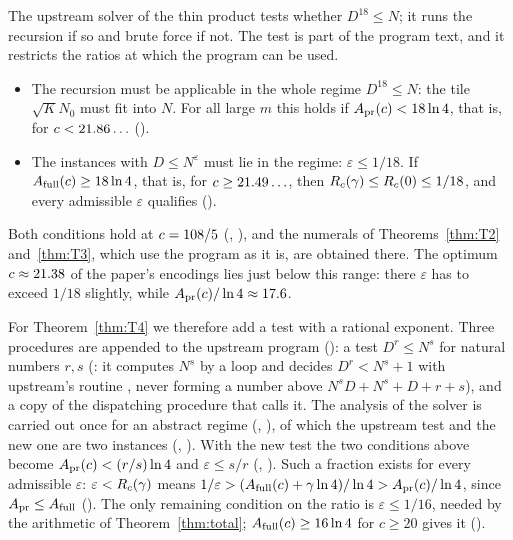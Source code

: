 The upstream solver of the thin product tests whether \(D^{18}\le N\); it runs
the recursion if so and brute force if not.  The test is part of the program
text, and it restricts the ratios at which the program can be used.
\begin{itemize}
\item The recursion must be applicable in the whole regime \(D^{18}\le N\): the
  tile \(\sqrt K N_0\) must fit into \(N\).  For all large \(m\) this holds if
  \(A_{\mathrm{pr}}(c)<18\ln 4\), that is, for \(c<21.86\ldots\)
  ().
\item The instances with \(D\le N^{\varepsilon}\) must lie in the regime:
  \(\varepsilon\le1/18\).  If \(A_{\mathrm{full}}(c)\ge18\ln 4\), that is, for
  \(c\ge21.49\ldots\), then \(R_{c}(\gamma)\le R_{c}(0)\le1/18\), and every
  admissible \(\varepsilon\) qualifies ().
\end{itemize}
Both conditions hold at \(c=108/5\) (,
), and the numerals of Theorems~\ref{thm:T2}
and~\ref{thm:T3}, which use the program as it is, are obtained there.  The
optimum \(c\approx21.38\) of the paper's encodings lies just below this
range: there \(\varepsilon\) has to exceed \(1/18\) slightly, while
\(A_{\mathrm{pr}}(c)/\ln4\approx17.6\).

For Theorem~\ref{thm:T4} we therefore add a test with a rational exponent.
Three procedures are appended to the upstream program (): a
test \(D^{r}\le N^{s}\) for natural numbers \(r,s\) (: it
computes \(N^{s}\) by a loop and decides \(D^{r}<N^{s}+1\) with upstream's
routine , never forming a number above \(N^{s}D+N^{s}+D+r+s\)),
and a copy of the dispatching procedure that calls it.  The analysis of the
solver is carried out once for an abstract regime (,
), of which the upstream test and the new one
are two instances (, ).  With the new test the two
conditions above become \(A_{\mathrm{pr}}(c)<(r/s)\ln4\) and \(\varepsilon\le s/r\)
(, ).  Such a fraction exists for
every admissible \(\varepsilon\): \(\varepsilon<R_{c}(\gamma)\) means
\(1/\varepsilon>(A_{\mathrm{full}}(c)+\gamma\ln4)/\ln4>A_{\mathrm{pr}}(c)/\ln4\), since
\(A_{\mathrm{pr}}\le A_{\mathrm{full}}\) ().  The only remaining
condition on the ratio is \(\varepsilon\le1/16\), needed by the arithmetic of
Theorem~\ref{thm:total}; \(A_{\mathrm{full}}(c)\ge16\ln4\) for \(c\ge20\) gives it
().

